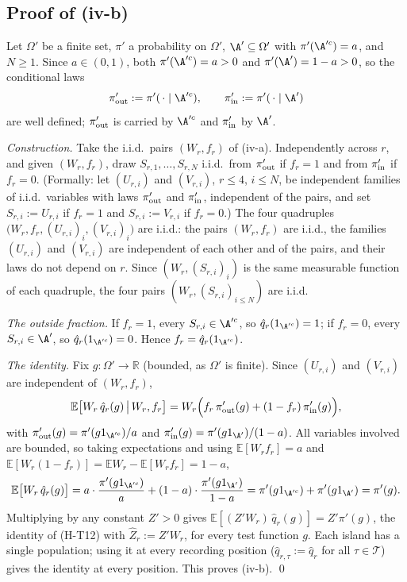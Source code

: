 \documentclass[11pt]{report}
\begin{document}
\subsection{Proof of (iv-b)}
Let $\Omega'$ be a finite set, $\pi'$ a probability on $\Omega'$, $\A'\subseteq\Omega'$ with $\pi'(\A'^c)=a$, and
$N\ge1$. Since $a\in(0,1)$, both $\pi'(\A'^c)=a>0$ and $\pi'(\A')=1-a>0$, so the conditional laws
\[
  \pi'_{\rm out}:=\pi'(\,\cdot\mid\A'^c),\qquad \pi'_{\rm in}:=\pi'(\,\cdot\mid\A')
\]
are well defined; $\pi'_{\rm out}$ is carried by $\A'^c$ and $\pi'_{\rm in}$ by $\A'$.

\emph{Construction.} Take the i.i.d.\ pairs $(W_r,f_r)$ of (iv-a). Independently across $r$, and given $(W_r,f_r)$,
draw $S_{r,1},\dots,S_{r,N}$ i.i.d.\ from $\pi'_{\rm out}$ if $f_r=1$ and from $\pi'_{\rm in}$ if $f_r=0$. (Formally:
let $(U_{r,i})$ and $(V_{r,i})$, $r\le4$, $i\le N$, be independent families of i.i.d.\ variables with laws
$\pi'_{\rm out}$ and $\pi'_{\rm in}$, independent of the pairs, and set $S_{r,i}:=U_{r,i}$ if $f_r=1$ and
$S_{r,i}:=V_{r,i}$ if $f_r=0$.) The four quadruples $\big(W_r,f_r,(U_{r,i})_i,(V_{r,i})_i\big)$ are i.i.d.: the
pairs $(W_r,f_r)$ are i.i.d., the families $(U_{r,i})$ and $(V_{r,i})$ are independent of each other and of the
pairs, and their laws do not depend on $r$. Since $(W_r,(S_{r,i})_i)$ is the same measurable function of each
quadruple, the four pairs $(W_r,(S_{r,i})_{i\le N})$ are i.i.d.

\emph{The outside fraction.} If $f_r=1$, every $S_{r,i}\in\A'^c$, so $\hat q_r(1_{\A'^c})=1$; if $f_r=0$, every
$S_{r,i}\in\A'$, so $\hat q_r(1_{\A'^c})=0$. Hence $f_r=\hat q_r(1_{\A'^c})$.

\emph{The identity.} Fix $g:\Omega'\to\mathbb R$ (bounded, as $\Omega'$ is finite). Since $(U_{r,i})$ and $(V_{r,i})$ are
independent of $(W_r,f_r)$,
\[
  \mathbb E\big[W_r\,\hat q_r(g)\,\big|\,W_r,f_r\big]
  =W_r\Big(f_r\,\pi'_{\rm out}(g)+(1-f_r)\,\pi'_{\rm in}(g)\Big),
\]
with $\pi'_{\rm out}(g)=\pi'(g1_{\A'^c})/a$ and $\pi'_{\rm in}(g)=\pi'(g1_{\A'})/(1-a)$. All variables involved are
bounded, so taking expectations and using $\mathbb E[W_rf_r]=a$ and $\mathbb E[W_r(1-f_r)]=\mathbb EW_r-\mathbb E[W_rf_r]=1-a$,
\[
  \mathbb E\big[W_r\,\hat q_r(g)\big]=a\cdot\frac{\pi'(g1_{\A'^c})}{a}+(1-a)\cdot\frac{\pi'(g1_{\A'})}{1-a}
  =\pi'(g1_{\A'^c})+\pi'(g1_{\A'})=\pi'(g).
\]
Multiplying by any constant $Z'>0$ gives $\mathbb E[(Z'W_r)\,\hat q_r(g)]=Z'\pi'(g)$, the identity of (H-T12) with
$\hat Z_r:=Z'W_r$, for every test function $g$. Each island has a single population; using it at every recording
position ($\hat q_{r,\tau}:=\hat q_r$ for all $\tau\in\mathcal T$) gives the identity at every position. This proves
(iv-b). \qed
\end{document}
